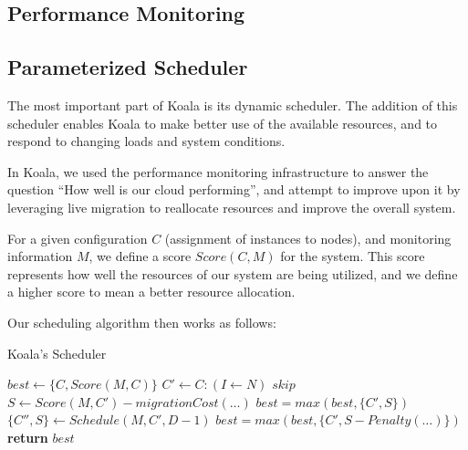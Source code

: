 \subsection{Performance Monitoring}

\subsection{Parameterized Scheduler}

The most important part of Koala is its dynamic scheduler.  The addition of this
scheduler enables Koala to make better use of the available resources, and to
respond to changing loads and system conditions.

In Koala, we used the performance monitoring infrastructure to answer the
question ``How well is our cloud performing'', and attempt to improve upon it by
leveraging live migration to reallocate resources and improve the overall
system.

For a given configuration $C$ (assignment of instances to nodes), and
monitoring information $M$, we define a score $Score(C,M)$ for the system.  This
score represents how well the resources of our system are being utilized, and we
define a higher score to mean a better resource allocation.

Our scheduling algorithm then works as follows:

\begin{algorithm}
\caption{Koala's Scheduler}
\label{algo:sched}
\footnotesize
\begin{algorithmic}
    \State $best \gets \{C,Score(M,C)\}$%
        \State $C' \gets C : (I \gets N)$
            \State $skip$
        \EndIf
        \State $S \gets Score(M,C') - migrationCost(\dots)$
        \State $best = max(best,\{C',S\})$
        \State $\{C'',S\} \gets Schedule(M,C',D-1)$
        \State $best = max(best,\{C', S - Penalty(\dots)\})$
        \EndIf
    \EndFor
    \State \textbf{return} $best$
\EndProcedure
\end{algorithmic}
\normalsize
\end{algorithm}


